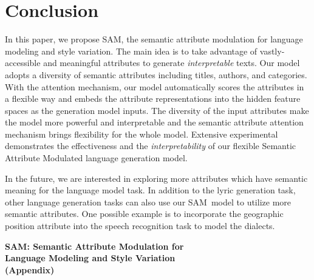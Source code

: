 \documentclass[a4paper]{article}
\newcommand{\method}{\xspace{SAM}}
\begin{document}
\section{Conclusion}
In this paper, we propose \method, the semantic attribute modulation for language modeling and style variation. The main idea is to take advantage of vastly-accessible and meaningful attributes to generate \emph{interpretable} texts. Our model adopts a diversity of semantic attributes including titles, authors, and categories. With the attention mechanism, our model automatically scores the attributes in a {flexible} way and embeds the attribute representations into the hidden feature spaces as the generation model inputs. 
The diversity of the input attributes make the model more powerful and interpretable and the semantic attribute attention mechanism brings flexibility for the whole model.
Extensive experimental demonstrates the effectiveness and the \emph{interpretability} of our flexible Semantic Attribute Modulated language generation model. 

In the future, we are interested in exploring more attributes which have semantic meaning for the language model task. In addition to the lyric generation task, other language generation tasks can also use our \method~model to utilize more semantic attributes. One possible example is to incorporate the geographic position attribute into the speech recognition task to model the dialects.
\iffalse
Applications:
\begin{itemize}
    \item Paper/speech correction
    \item title-aware generation
    \item Document-level machine translation
\end{itemize}
\fi
\clearpage


\clearpage
\begin{center}
\textbf{\huge\method: Semantic Attribute Modulation for \\Language Modeling and Style Variation} \\
\textbf{\huge (Appendix)}
\end{center}
\end{document}
